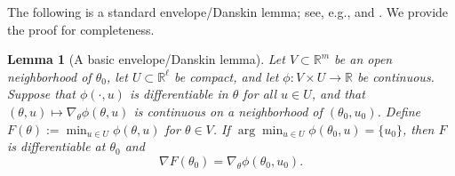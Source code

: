\documentclass{article}
\theoremstyle{normaltheorem}
\newtheorem{lemma}[lemma]{Lemma}
\newcommand{\R}{\mathbb{R}}
\begin{document}
	The following is a standard envelope/Danskin lemma; see, e.g., \citet{danskin1967theory} and
	\citet[Prop.~2.1]{oyama2018nondifferentiability}. We provide the proof for completeness.
	\begin{lemma}[A basic envelope/Danskin lemma]\label{lem:envelope-unique}
	Let \(V\subset\R^m\) be an open neighborhood of \(\theta_0\), let \(U\subset\R^\ell\) be compact, and let
	\(\phi:V\times U\to\R\) be continuous. Suppose that \(\phi(\cdot,u)\) is differentiable in \(\theta\) for all
	\(u\in U\), and that \((\theta,u)\mapsto\nabla_\theta\phi(\theta,u)\) is continuous on a neighborhood of
	\((\theta_0,u_0)\).
	Define \(F(\theta):=\min_{u\in U}\phi(\theta,u)\) for \(\theta\in V\).
	If $\arg\min_{u\in U}\phi(\theta_0,u)=\{u_0\}$, then $F$ is differentiable at $\theta_0$ and
	\[
	\nabla F(\theta_0)=\nabla_\theta\phi(\theta_0,u_0).
	\]
	\end{lemma}
\end{document}
